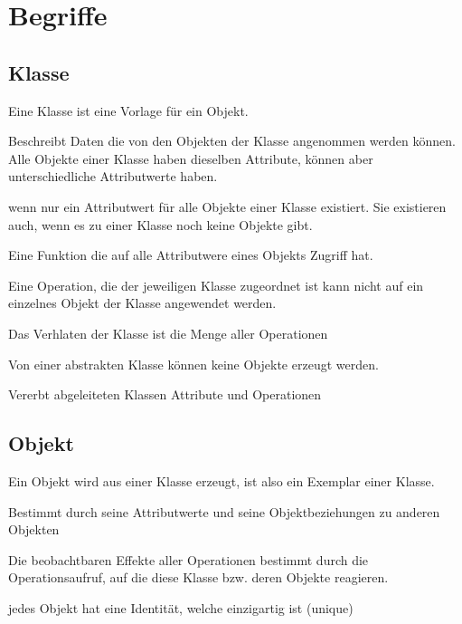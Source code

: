 \section{Begriffe}
\subsection{Klasse}
	Eine Klasse ist eine Vorlage für ein Objekt.
	\begin{description}[style=multiline,leftmargin=4.5cm,rightmargin=2cm,
	topsep=0pt]
	\item[Attribut] Beschreibt Daten die von den Objekten der Klasse angenommen
		werden können. Alle Objekte einer Klasse haben dieselben Attribute, können
		aber unterschiedliche Attributwerte haben.
	\item[Klassenattribut] wenn nur ein Attributwert für alle Objekte einer Klasse
		existiert. Sie existieren auch, wenn es zu einer Klasse noch keine Objekte
		gibt.
	\item[Operation] Eine Funktion die auf alle Attributwere eines Objekts Zugriff
		hat.
	\item[Klassenoperation] Eine Operation, die der jeweiligen Klasse zugeordnet
		ist kann nicht auf ein einzelnes Objekt der Klasse angewendet werden. 
	\item[Verhalten] Das Verhlaten der Klasse ist die Menge aller Operationen
	\item[Abstrakte] Von einer abstrakten Klasse können keine Objekte erzeugt
		werden.
	\item[Basisklasse] Vererbt abgeleiteten Klassen Attribute und Operationen
	\end{description}
	
\subsection{Objekt}
	Ein Objekt wird aus einer Klasse erzeugt, ist also ein Exemplar einer Klasse.
	\begin{description}[style=multiline, leftmargin=4.5cm, rightmargin=2cm,
		topsep=0pt]
		\item[Zustand] Bestimmt durch seine Attributwerte und seine Objektbeziehungen
			zu anderen Objekten
		\item[Verhalten] Die beobachtbaren Effekte aller Operationen bestimmt durch
			die Operationsaufruf, auf die diese Klasse bzw. deren Objekte reagieren.
		\item[Objektidentität] jedes Objekt hat eine Identität, welche einzigartig ist
			(unique)
	\end{description}
	
